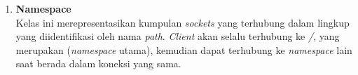 \begin{enumerate}
\begin{itemize}
			
%			
			
%	
%	
		
			
		\end{itemize}

	\item \textbf{Namespace} \\ 
	Kelas ini merepresentasikan kumpulan \textit{sockets} yang terhubung dalam lingkup yang diidentifikasi oleh nama \textit{path}. \textit{Client} akan selalu terhubung ke \textit{/}, yang merupakan (\textit{namespace} utama), kemudian dapat terhubung ke \textit{namespace} lain saat berada dalam koneksi yang sama.
	

\end{enumerate}
